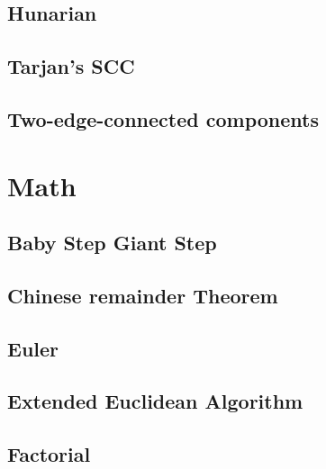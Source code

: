 \subsection{Hunarian}
\raggedbottom
\subsection{Tarjan's SCC}
\raggedbottom
\subsection{Two-edge-connected components}
\raggedbottom

\hrulefill
\section{Math}
\subsection{Baby Step Giant Step}
\raggedbottom
\subsection{Chinese remainder Theorem}
\raggedbottom
\subsection{Euler}
\raggedbottom
\subsection{Extended Euclidean Algorithm}
\raggedbottom
\subsection{Factorial}
\raggedbottom
